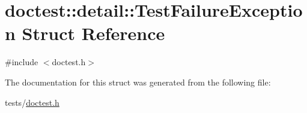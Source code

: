 \hypertarget{structdoctest_1_1detail_1_1TestFailureException}{}\section{doctest\+:\+:detail\+:\+:Test\+Failure\+Exception Struct Reference}
\label{structdoctest_1_1detail_1_1TestFailureException}


{\ttfamily \#include $<$doctest.\+h$>$}



The documentation for this struct was generated from the following file\+:\begin{DoxyCompactItemize}
\item 
tests/\hyperlink{doctest_8h}{doctest.\+h}\end{DoxyCompactItemize}

